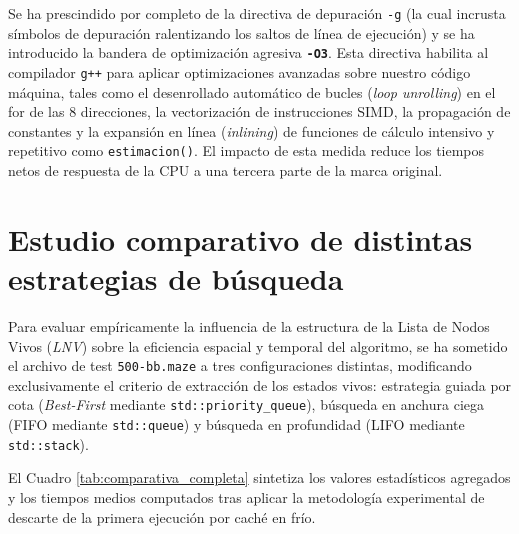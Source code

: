 \documentclass[11pt,a4paper]{article}
\begin{document}
Se ha prescindido por completo de la directiva de depuración \texttt{-g} (la cual incrusta símbolos de depuración ralentizando los saltos de línea de ejecución) y se ha introducido la bandera de optimización agresiva \textbf{\texttt{-O3}}. Esta directiva habilita al compilador \texttt{g++} para aplicar optimizaciones avanzadas sobre nuestro código máquina, tales como el desenrollado automático de bucles (\textit{loop unrolling}) en el for de las 8 direcciones, la vectorización de instrucciones SIMD, la propagación de constantes y la expansión en línea (\textit{inlining}) de funciones de cálculo intensivo y repetitivo como \texttt{estimacion()}. El impacto de esta medida reduce los tiempos netos de respuesta de la CPU a una tercera parte de la marca original.


\section{Estudio comparativo de distintas estrategias de búsqueda}
Para evaluar empíricamente la influencia de la estructura de la Lista de Nodos Vivos (\textit{LNV}) sobre la eficiencia espacial y temporal del algoritmo, se ha sometido el archivo de test \texttt{500-bb.maze} a tres configuraciones distintas, modificando exclusivamente el criterio de extracción de los estados vivos: estrategia guiada por cota (\textit{Best-First} mediante \texttt{std::priority\_queue}), búsqueda en anchura ciega (FIFO mediante \texttt{std::queue}) y búsqueda en profundidad (LIFO mediante \texttt{std::stack}).

El Cuadro \ref{tab:comparativa_completa} sintetiza los valores estadísticos agregados y los tiempos medios computados tras aplicar la metodología experimental de descarte de la primera ejecución por caché en frío.
\end{document}
